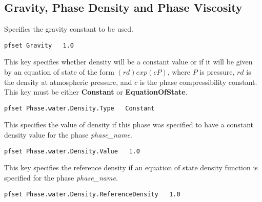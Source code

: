 
\subsection{Gravity, Phase Density and Phase Viscosity}
\label{Gravity, Phase Density and Phase Viscosity}

{Specifies the gravity constant to be used.}
\begin{display}\begin{verbatim}
pfset Gravity	1.0
\end{verbatim}\end{display}

{This key specifies whether density will be a constant value or if 
it will be given by an equation of state of the form $(rd)exp(cP)$, 
where $P$ is pressure, $rd$ is
the density at atmospheric pressure, and $c$ is the phase
compressibility constant.
This key must be either {\bf Constant} or {\bf EquationOfState}.
}
\begin{display}\begin{verbatim}
pfset Phase.water.Density.Type	 Constant
\end{verbatim}\end{display}

{This specifies the value of density if this phase was specified to have a
constant density value for the phase {\em phase\_name}.}
\begin{display}\begin{verbatim}
pfset Phase.water.Density.Value   1.0
\end{verbatim}\end{display}

{This key specifies the reference density if an equation of state density
function is specified for the phase {\em phase\_name}.}
\begin{display}\begin{verbatim}
pfset Phase.water.Density.ReferenceDensity   1.0
\end{verbatim}\end{display}

